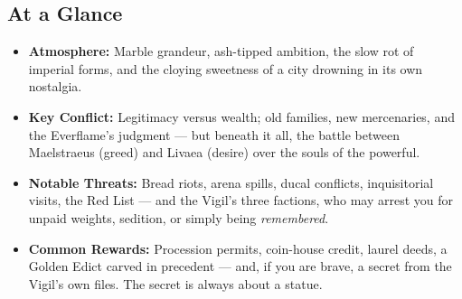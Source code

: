 \subsection*{At a Glance}
\begin{itemize}[leftmargin=*]
    \item \textbf{Atmosphere:} Marble grandeur, ash-tipped ambition, the slow rot of imperial forms, and the cloying sweetness of a city drowning in its own nostalgia.
    \item \textbf{Key Conflict:} Legitimacy versus wealth; old families, new mercenaries, and the Everflame's judgment --- but beneath it all, the battle between Maelstraeus (greed) and Livaea (desire) over the souls of the powerful.
    \item \textbf{Notable Threats:} Bread riots, arena spills, ducal conflicts, inquisitorial visits, the Red List --- and the Vigil's three factions, who may arrest you for unpaid weights, sedition, or simply being \textit{remembered}.
    \item \textbf{Common Rewards:} Procession permits, coin-house credit, laurel deeds, a Golden Edict carved in precedent --- and, if you are brave, a secret from the Vigil's own files. The secret is always about a statue.
\end{itemize}

